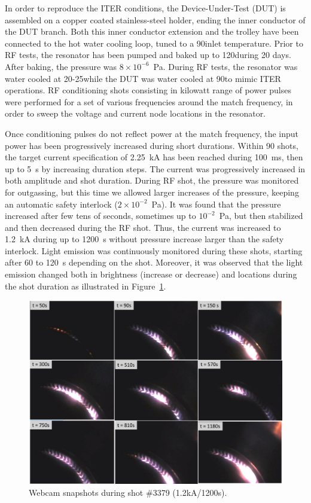 {In order to reproduce the ITER conditions, the Device-Under-Test (DUT) is assembled on a copper coated stainless-steel holder, ending the inner conductor of the DUT branch. Both this inner conductor extension and the trolley have been connected to the hot water cooling loop, tuned to a 90\degC inlet temperature. Prior to RF tests, the resonator has been pumped and baked up to 120\degC during 20 days. After baking, the pressure was $8\times10^{-6}$~Pa. During RF tests, the resonator was water cooled at 20-25\degC while the DUT was water cooled at 90\degC to mimic ITER operations. RF conditioning shots consisting in kilowatt range of power pulses were performed for a set of various frequencies around the match frequency, in order to sweep the voltage and current node locations in the resonator. 

Once conditioning pulses do not reflect power at the match frequency, the input power has been progressively increased during short durations. Within 90 shots, the target current specification of 2.25~kA has been reached during 100~ms, then up to 5~s by increasing duration steps. The current was progressively increased in both amplitude and shot duration. During RF shot, the pressure was monitored for outgassing, but this time we allowed larger increases of the pressure, keeping an automatic safety interlock ($2\times10^{-2}$~Pa). It was found that the pressure increased after few tens of seconds, sometimes up to $10^{-2}$~Pa, but then stabilized and then decreased during the RF shot. Thus, the current was increased to 1.2~kA during up to 1200~s without pressure increase larger than the safety interlock. Light emission was continuously monitored during these shots, starting after 60 to 120~s depending on the shot. Moreover, it was observed that the light emission changed both in brightness (increase or decrease) and locations during the shot duration as illustrated in Figure~\ref{fig:rfcontactlacutlightemission}.

\begin{figure}[h]
	\centering
	\includegraphics[width=0.7\linewidth]{figures/chap3/RF_contacts/RF_contact_LACUT_light_emission}
	\caption{Webcam snapshots during shot \#3379 (1.2kA/1200s).}
	\label{fig:rfcontactlacutlightemission}
\end{figure}

}
